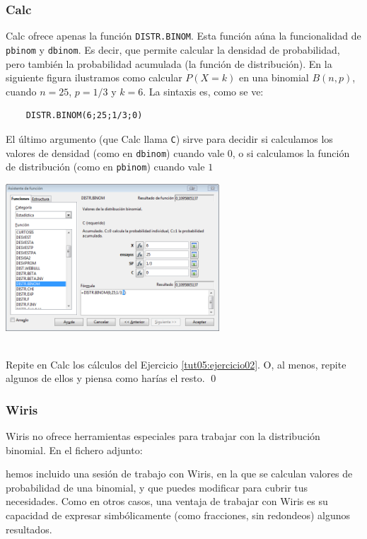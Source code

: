 \documentclass[10pt,a4paper]{article}\usepackage[]{graphicx}\usepackage[]{color}
\begin{document}
\subsubsection*{Calc}

Calc ofrece apenas la función {\tt DISTR.BINOM}. Esta función aúna la funcionalidad de {\tt pbinom} y {\tt dbinom}. Es decir, que permite calcular la densidad de probabilidad, pero también la probabilidad acumulada (la función de distribución). En la siguiente figura ilustramos como calcular $P(X=k)$ en una binomial $B(n,p)$, cuando $n=25$, $p=1/3$ y $k=6$. La sintaxis es, como se ve:
    \begin{center}
    \begin{minipage}{10cm}
    \begin{verbatim}
    DISTR.BINOM(6;25;1/3;0)
    \end{verbatim}
    \end{minipage}
    \end{center}
El último argumento (que Calc llama {\tt C}) sirve para decidir si calculamos los valores de densidad (como en {\tt dbinom}) cuando vale $0$, o si calculamos la función de distribución (como en {\tt pbinom}) cuando vale $1$
\begin{center}
    \includegraphics[width=8cm]{../fig/Tut05-19.png}
\end{center}

\begin{ejercicio}
\label{tut05:ejercicio08}
\quad\\
Repite en Calc los cálculos del Ejercicio \ref{tut05:ejercicio02}. O, al menos, repite algunos de ellos y piensa como harías el resto.
\qed
\end{ejercicio}

\subsubsection*{Wiris}

Wiris no ofrece herramientas especiales para trabajar con la distribución binomial. En el fichero adjunto:
\begin{center}
\end{center}
hemos incluido una sesión de trabajo con Wiris, en la que se calculan valores de probabilidad de una binomial, y que puedes modificar para cubrir tus necesidades. Como en otros casos, una ventaja de trabajar con Wiris es su capacidad de expresar simbólicamente (como fracciones, sin redondeos) algunos resultados.
\end{document}
